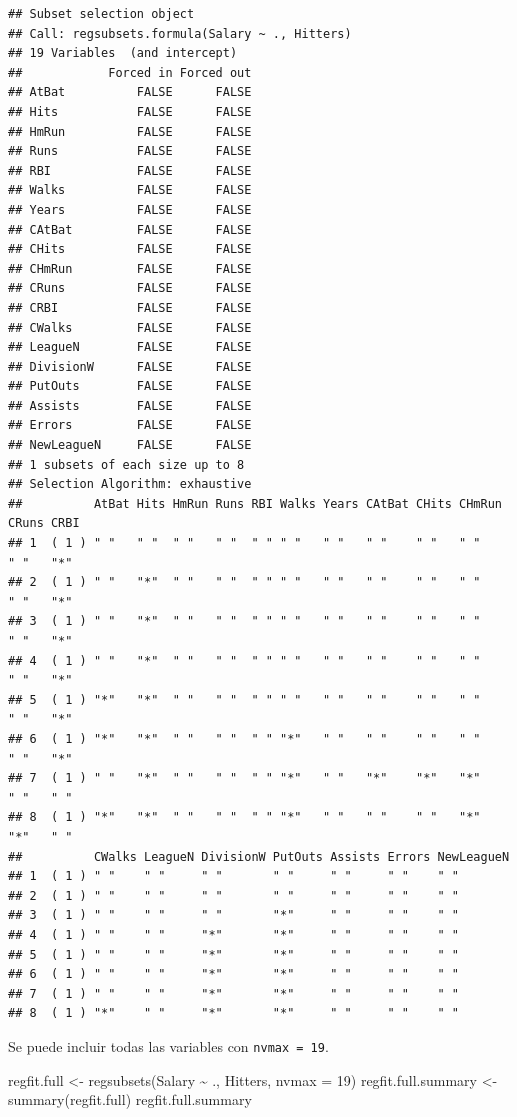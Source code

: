 \documentclass[
  12pt,
]{book}
\newenvironment{Shaded}{\begin{snugshade}}{\end{snugshade}}
\newcommand{\AttributeTok}[1]{\textcolor[rgb]{0.77,0.63,0.00}{#1}}
\newcommand{\DecValTok}[1]{\textcolor[rgb]{0.00,0.00,0.81}{#1}}
\newcommand{\FunctionTok}[1]{\textcolor[rgb]{0.00,0.00,0.00}{#1}}
\newcommand{\NormalTok}[1]{#1}
\newcommand{\OtherTok}[1]{\textcolor[rgb]{0.56,0.35,0.01}{#1}}
\newcommand{\SpecialCharTok}[1]{\textcolor[rgb]{0.00,0.00,0.00}{#1}}
\theoremstyle{definition}
\theoremstyle{definition}
\theoremstyle{definition}
\theoremstyle{remark}
\begin{document}
\begin{verbatim}
## Subset selection object
## Call: regsubsets.formula(Salary ~ ., Hitters)
## 19 Variables  (and intercept)
##            Forced in Forced out
## AtBat          FALSE      FALSE
## Hits           FALSE      FALSE
## HmRun          FALSE      FALSE
## Runs           FALSE      FALSE
## RBI            FALSE      FALSE
## Walks          FALSE      FALSE
## Years          FALSE      FALSE
## CAtBat         FALSE      FALSE
## CHits          FALSE      FALSE
## CHmRun         FALSE      FALSE
## CRuns          FALSE      FALSE
## CRBI           FALSE      FALSE
## CWalks         FALSE      FALSE
## LeagueN        FALSE      FALSE
## DivisionW      FALSE      FALSE
## PutOuts        FALSE      FALSE
## Assists        FALSE      FALSE
## Errors         FALSE      FALSE
## NewLeagueN     FALSE      FALSE
## 1 subsets of each size up to 8
## Selection Algorithm: exhaustive
##          AtBat Hits HmRun Runs RBI Walks Years CAtBat CHits CHmRun CRuns CRBI
## 1  ( 1 ) " "   " "  " "   " "  " " " "   " "   " "    " "   " "    " "   "*" 
## 2  ( 1 ) " "   "*"  " "   " "  " " " "   " "   " "    " "   " "    " "   "*" 
## 3  ( 1 ) " "   "*"  " "   " "  " " " "   " "   " "    " "   " "    " "   "*" 
## 4  ( 1 ) " "   "*"  " "   " "  " " " "   " "   " "    " "   " "    " "   "*" 
## 5  ( 1 ) "*"   "*"  " "   " "  " " " "   " "   " "    " "   " "    " "   "*" 
## 6  ( 1 ) "*"   "*"  " "   " "  " " "*"   " "   " "    " "   " "    " "   "*" 
## 7  ( 1 ) " "   "*"  " "   " "  " " "*"   " "   "*"    "*"   "*"    " "   " " 
## 8  ( 1 ) "*"   "*"  " "   " "  " " "*"   " "   " "    " "   "*"    "*"   " " 
##          CWalks LeagueN DivisionW PutOuts Assists Errors NewLeagueN
## 1  ( 1 ) " "    " "     " "       " "     " "     " "    " "       
## 2  ( 1 ) " "    " "     " "       " "     " "     " "    " "       
## 3  ( 1 ) " "    " "     " "       "*"     " "     " "    " "       
## 4  ( 1 ) " "    " "     "*"       "*"     " "     " "    " "       
## 5  ( 1 ) " "    " "     "*"       "*"     " "     " "    " "       
## 6  ( 1 ) " "    " "     "*"       "*"     " "     " "    " "       
## 7  ( 1 ) " "    " "     "*"       "*"     " "     " "    " "       
## 8  ( 1 ) "*"    " "     "*"       "*"     " "     " "    " "
\end{verbatim}

Se puede incluir todas las variables con \texttt{nvmax\ =\ 19}.

\begin{Shaded}
\begin{Highlighting}[]
\NormalTok{regfit.full }\OtherTok{\textless{}{-}} \FunctionTok{regsubsets}\NormalTok{(Salary }\SpecialCharTok{\textasciitilde{}}\NormalTok{ ., Hitters, }\AttributeTok{nvmax =} \DecValTok{19}\NormalTok{)}
\NormalTok{regfit.full.summary }\OtherTok{\textless{}{-}} \FunctionTok{summary}\NormalTok{(regfit.full)}
\NormalTok{regfit.full.summary}
\end{Highlighting}
\end{Shaded}
\end{document}
